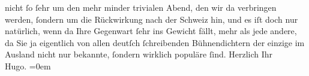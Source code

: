 \begin{ledgroupsized}[t]{13cm}
               nicht ſo ſehr um den mehr minder trivialen Abend, den wir da verbringen werden,
               ſondern um die Rückwirkung nach der Schweiz
               hin, und es iſt doch nur natürlich, wenn da Ihre Gegenwart ſehr ins Gewicht fällt,
               mehr als jede andere, da Sie ja eigentlich von allen deutſch ſchreibenden
               Bühnendichtern der einzige \introOben{}im Ausland\introOben{} nicht nur bekannte,
               ſondern wirklich populäre ſind.\pend
           \pstart
           Herzlich Ihr{\\[\baselineskip]}\spacefill\mbox{Hugo.}\pend
           \leftskip=0em{}
         
         \endnumbering{}\end{ledgroupsized}  \newcommand{\dateiname}{L02259}\newcommand{\titel}{Hugo von Hofmannsthal an Arthur Schnitzler, 30. 4. [1917]}\newcommand{\editorInnen}{Martin Anton Müller und Gerd-Hermann Susen}
      